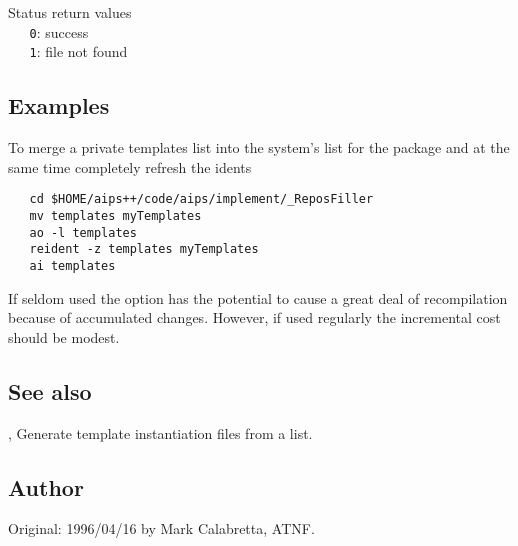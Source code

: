 Status return values
\\ \verb+   0+: success
\\ \verb+   1+: file not found
 
\subsection*{Examples}
 
To merge a private templates list into the system's list for the 
package and at the same time completely refresh the idents

\begin{verbatim}
   cd $HOME/aips++/code/aips/implement/_ReposFiller
   mv templates myTemplates
   ao -l templates
   reident -z templates myTemplates
   ai templates
\end{verbatim}

\noindent
If seldom used the  option has the potential to cause a great deal of
recompilation because of accumulated changes.  However, if used regularly the
incremental cost should be modest.
 
\subsection*{See also}
 
, Generate template instantiation files from a list.
 
\subsection*{Author}
 
Original: 1996/04/16 by Mark Calabretta, ATNF.
